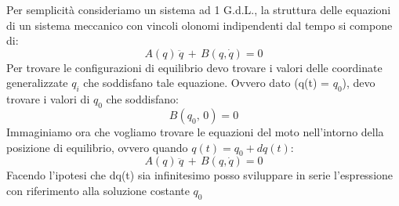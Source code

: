 Per semplicità consideriamo un sistema ad 1 G.d.L., la struttura delle equazioni di un sistema meccanico con vincoli olonomi indipendenti dal tempo si compone di:
\[A(q)\,\ddot{q}\,+\,B(q,\dot{q}) = 0\]
Per trovare le configurazioni di equilibrio devo trovare i valori delle coordinate generalizzate $q_i$ che soddisfano tale equazione. Ovvero dato (q(t) = $q_0$), devo trovare i valori di $q_0$ che soddisfano:
\[B(q_0,\,0) = 0\]
Immaginiamo ora che vogliamo trovare le equazioni del moto nell'intorno della posizione di equilibrio, ovvero quando $q(t) = q_0 + dq(t)$:
\[A(q)\,\ddot{q}\,+\,B(q,\dot{q})=0\]
Facendo l'ipotesi che dq(t) sia infinitesimo posso sviluppare in serie l'espressione con riferimento alla soluzione costante $q_0$
